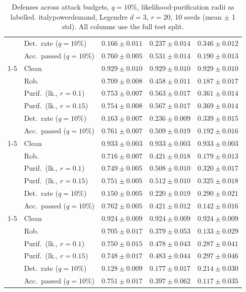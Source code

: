 \begin{table}[htbp]
\begin{tabular}{@{}llrrr@{}}
     & Det.\ rate ($q{=}10\%$) & $\mathbf{0.166 \pm 0.011}$ & $\mathbf{0.237 \pm 0.014}$ & $\mathbf{0.346 \pm 0.012}$ \\
     & Acc.\ passed ($q{=}10\%$) & $0.760 \pm 0.005$ & $0.531 \pm 0.014$ & $0.190 \pm 0.013$ \\
    \cmidrule(lr){1-5}
    \multirow{6}{*}{$\alpha{=}0.2$} & Clean & $0.929 \pm 0.010$ & $0.929 \pm 0.010$ & $0.929 \pm 0.010$ \\
     & Rob. & $0.709 \pm 0.008$ & $0.458 \pm 0.011$ & $0.187 \pm 0.017$ \\
     & Purif.\ (lk., $r{=}0.1$) & $0.753 \pm 0.007$ & $0.563 \pm 0.017$ & $0.361 \pm 0.014$ \\
     & Purif.\ (lk., $r{=}0.15$) & $0.754 \pm 0.008$ & $0.567 \pm 0.017$ & $0.369 \pm 0.014$ \\
     & Det.\ rate ($q{=}10\%$) & $0.163 \pm 0.007$ & $0.236 \pm 0.009$ & $0.339 \pm 0.015$ \\
     & Acc.\ passed ($q{=}10\%$) & $0.761 \pm 0.007$ & $0.509 \pm 0.019$ & $0.192 \pm 0.016$ \\
    \cmidrule(lr){1-5}
    \multirow{6}{*}{$\alpha{=}0.5$} & Clean & $0.933 \pm 0.003$ & $0.933 \pm 0.003$ & $0.933 \pm 0.003$ \\
     & Rob. & $0.716 \pm 0.007$ & $0.421 \pm 0.018$ & $0.179 \pm 0.013$ \\
     & Purif.\ (lk., $r{=}0.1$) & $0.749 \pm 0.005$ & $0.508 \pm 0.010$ & $0.320 \pm 0.017$ \\
     & Purif.\ (lk., $r{=}0.15$) & $0.751 \pm 0.005$ & $0.512 \pm 0.010$ & $0.325 \pm 0.018$ \\
     & Det.\ rate ($q{=}10\%$) & $0.150 \pm 0.005$ & $0.220 \pm 0.019$ & $0.290 \pm 0.021$ \\
     & Acc.\ passed ($q{=}10\%$) & $0.762 \pm 0.005$ & $0.421 \pm 0.012$ & $0.142 \pm 0.016$ \\
    \cmidrule(lr){1-5}
    \multirow{6}{*}{$\alpha{=}1$} & Clean & $0.924 \pm 0.009$ & $0.924 \pm 0.009$ & $0.924 \pm 0.009$ \\
     & Rob. & $0.705 \pm 0.017$ & $0.379 \pm 0.053$ & $0.133 \pm 0.029$ \\
     & Purif.\ (lk., $r{=}0.1$) & $0.750 \pm 0.015$ & $0.478 \pm 0.043$ & $0.287 \pm 0.041$ \\
     & Purif.\ (lk., $r{=}0.15$) & $0.748 \pm 0.017$ & $0.483 \pm 0.044$ & $0.297 \pm 0.046$ \\
     & Det.\ rate ($q{=}10\%$) & $0.128 \pm 0.009$ & $0.177 \pm 0.017$ & $0.214 \pm 0.030$ \\
     & Acc.\ passed ($q{=}10\%$) & $0.751 \pm 0.017$ & $0.397 \pm 0.062$ & $0.117 \pm 0.035$ \\
    \bottomrule
  \end{tabular}
  \caption{Defenses across attack budgets, $q{=}10\%$, likelihood-purification radii as labelled. italypowerdemand, Legendre $d{=}3$, $r{=}20$, 10 seeds (mean $\pm$ 1 std). All columns use the full test split.}
  \label{tab:italypowerdemand_models_r20}
\end{table}
